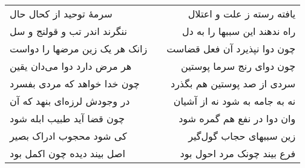 \begin{center}
\begin{longtable}{l p{0.5cm} r}
\\
سرمهٔ توحید از کحال حال
&&
یافته رسته ز علت و اعتلال
\\
ننگرند اندر تب و قولنج و سل
&&
راه ندهند این سببها را به دل
\\
زانک هر یک زین مرضها را دواست
&&
چون دوا نپذیرد آن فعل قضاست
\\
هر مرض دارد دوا می‌دان یقین
&&
چون دوای رنج سرما پوستین
\\
چون خدا خواهد که مردی بفسرد
&&
سردی از صد پوستین هم بگذرد
\\
در وجودش لرزه‌ای بنهد که آن
&&
نه به جامه به شود نه از آشیان
\\
چون قضا آید طبیب ابله شود
&&
وان دوا در نفع هم گمره شود
\\
کی شود محجوب ادراک بصیر
&&
زین سببهای حجاب گول‌گیر
\\
اصل بیند دیده چون اکمل بود
&&
فرع بیند چونک مرد احول بود
\\
\end{longtable}
\end{center}
